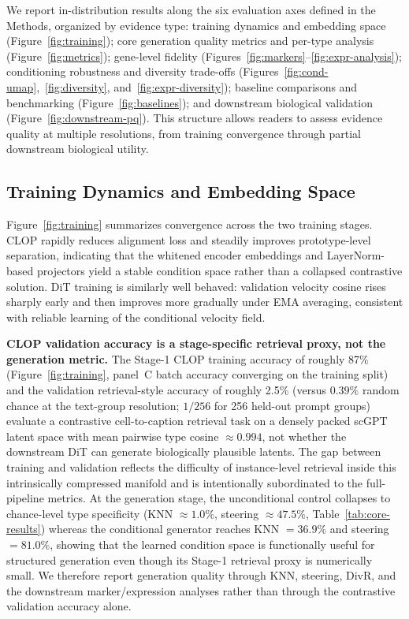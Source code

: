 \documentclass[11pt,a4paper]{article}
\begin{document}
We report in-distribution results along the six evaluation axes defined in the Methods, organized by evidence type:
training dynamics and embedding space (Figure~\ref{fig:training});
core generation quality metrics and per-type analysis (Figure~\ref{fig:metrics});
gene-level fidelity (Figures~\ref{fig:markers}--\ref{fig:expr-analysis});
conditioning robustness and diversity trade-offs (Figures~\ref{fig:cond-umap},~\ref{fig:diversity}, and~\ref{fig:expr-diversity});
baseline comparisons and benchmarking (Figure~\ref{fig:baselines});
and downstream biological validation (Figure~\ref{fig:downstream-pq}).
This structure allows readers to assess evidence quality at multiple resolutions, from training convergence through partial downstream biological utility.

\subsection{Training Dynamics and Embedding Space}

Figure~\ref{fig:training} summarizes convergence across the two training stages. CLOP rapidly reduces alignment loss and steadily improves prototype-level separation, indicating that the whitened encoder embeddings and LayerNorm-based projectors yield a stable condition space rather than a collapsed contrastive solution. DiT training is similarly well behaved: validation velocity cosine rises sharply early and then improves more gradually under EMA averaging, consistent with reliable learning of the conditional velocity field.

\textbf{CLOP validation accuracy is a stage-specific retrieval proxy, not the generation metric.} The Stage-1 CLOP training accuracy of roughly 87\% (Figure~\ref{fig:training}, panel~C batch accuracy converging on the training split) and the validation retrieval-style accuracy of roughly 2.5\% (versus $0.39\%$ random chance at the text-group resolution; $1/256$ for 256 held-out prompt groups) evaluate a contrastive cell-to-caption retrieval task on a densely packed scGPT latent space with mean pairwise type cosine $\approx 0.994$, not whether the downstream DiT can generate biologically plausible latents. The gap between training and validation reflects the difficulty of instance-level retrieval inside this intrinsically compressed manifold and is intentionally subordinated to the full-pipeline metrics. At the generation stage, the unconditional control collapses to chance-level type specificity (KNN $\approx 1.0\%$, steering $\approx 47.5\%$, Table~\ref{tab:core-results}) whereas the conditional generator reaches KNN $= 36.9\%$ and steering $= 81.0\%$, showing that the learned condition space is functionally useful for structured generation even though its Stage-1 retrieval proxy is numerically small. We therefore report generation quality through KNN, steering, DivR, and the downstream marker/expression analyses rather than through the contrastive validation accuracy alone.
\end{document}

